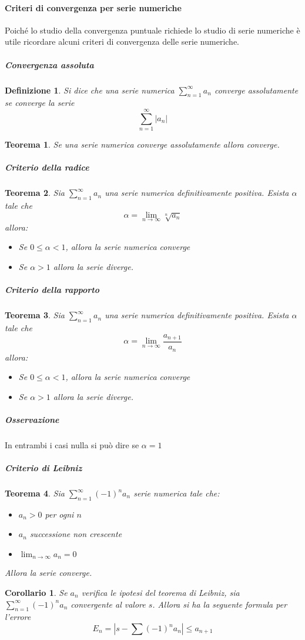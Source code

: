 \documentclass[a4paper,12pt]{article}
\newtheorem{teo}{Teorema}
\newtheorem{defi}{Definizione}
\newtheorem{cor}{Corollario}
\begin{document}
\paragraph*{Criteri di convergenza per serie numeriche}
Poiché lo studio della convergenza puntuale richiede lo studio di serie numeriche è utile ricordare alcuni criteri di convergenza delle serie numeriche.
\subparagraph*{Convergenza assoluta}
\begin{defi}
Si dice che una serie numerica $\sum_{n=1}^{\infty}a_n$ converge assolutamente se converge la serie
$$\sum_{n=1}^{\infty}|a_n|$$
\end{defi}
\begin{teo}
Se una serie numerica converge assolutamente allora converge.
\end{teo}
\subparagraph*{Criterio della radice}
\begin{teo}
Sia  $\sum_{n=1}^{\infty}a_n$ una serie numerica definitivamente positiva. Esista $\alpha$ tale che
$$\alpha=\lim_{n\to\infty}\sqrt[n]{a_n}$$
allora:
\begin{itemize}
\item Se $0\leq\alpha<1$, allora la serie numerica converge
\item Se $\alpha>1 $ allora la serie diverge.
\end{itemize}
\end{teo}
\subparagraph*{Criterio della rapporto}
\begin{teo}
Sia  $\sum_{n=1}^{\infty}a_n$ una serie numerica definitivamente positiva. Esista $\alpha$ tale che
$$\alpha=\lim_{n\to\infty}\frac{a_{n+1}}{a_n}$$
allora:
\begin{itemize}
\item Se $0\leq\alpha<1$, allora la serie numerica converge
\item Se $\alpha>1 $ allora la serie diverge.
\end{itemize}
\end{teo}
\subparagraph*{Osservazione}
In entrambi i casi nulla si può dire se $\alpha=1$
\subparagraph*{Criterio di Leibniz}
\begin{teo}
Sia $\sum_{n=1}^{\infty} (-1)^n a_n$ serie numerica tale che:
\begin{itemize}
\item  $a_n > 0$ per ogni $n$
\item $a_n$ successione non crescente
\item $\lim_{n\to\infty} a_n=0$
\end{itemize}
Allora la serie converge.
\end{teo}
\begin{cor}
Se $a_n$ verifica le ipotesi del teorema di Leibniz, sia $\sum_{n=1}^{\infty} (-1)^n a_n$ convergente al valore $s$. Allora si ha la seguente formula per l'errore
$$E_n=\left|s- \sum (-1)^n a_n  \right|\leq a_{n+1}$$
\end{cor}
\end{document}
